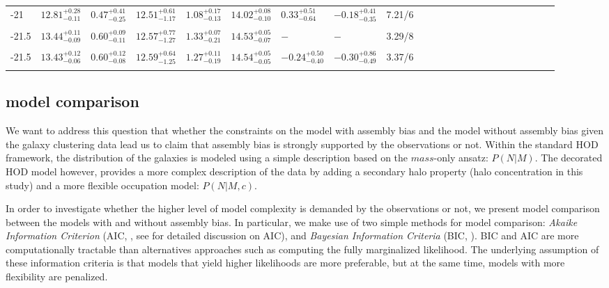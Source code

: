 \documentclass[12pt, preprint]{aastex}
\begin{document}
\begin{table}
\begin{center}
\begin{tabular}{@{}lllllllllllllllllllllll}
-21 & $12.81^{+0.28}_{-0.11}$ &  $0.47^{+0.41}_{-0.25}$ & $12.51^{+0.61}_{-1.17}$ & $1.08^{+0.17}_{-0.13}$ &  $14.02^{+0.08}_{-0.10}$ & $0.33^{+0.51}_{-0.64}$ & $-0.18^{+0.41}_{-0.35}$ & 7.21/6\\ \\

-21.5 & $13.44^{+0.11}_{-0.09}$ &  $0.60^{+0.09}_{-0.11}$ & $12.57^{+0.77}_{-1.27}$ & $1.33^{+0.07}_{-0.21}$ &  $14.53^{+0.05}_{-0.07}$ & $-$ & $-$ & 3.29/8\\ \\

-21.5 & $13.43^{+0.12}_{-0.06}$ &  $0.60^{+0.12}_{-0.08}$ & $12.59^{+0.64}_{-1.25}$ & $1.27^{+0.11}_{-0.19}$ &  $14.54^{+0.05}_{-0.05}$ & $-0.24^{+0.50}_{-0.40}$ & $-0.30^{+0.86}_{-0.49}$ & 3.37/6\\ \\
                 
 \hline
  \end{tabular}
\end{center}
\end{table}



\subsection{model comparison}

We want to address this question that whether the constraints on the model with assembly bias and the model without assembly bias given the galaxy clustering data lead us to claim that assembly bias is strongly supported by the observations or not. Within the standard HOD framework, the distribution of the galaxies is modeled using a simple description based on the $mass$-only ansatz: $P(N|M)$. The decorated HOD model however, provides a more complex description of the data by adding a secondary halo property (halo concentration in this study) and a more flexible occupation model: $P(N|M,c)$. 

In order to investigate whether the higher level of model complexity is demanded by the observations or not, we present model comparison between the models with and without assembly bias. In particular, we make use of two simple methods for model comparison: \emph{Akaike Information Criterion} (AIC, \citealt{aic} , see \citealt{gelmanic} for detailed discussion on AIC), and \emph{Bayesian Information Criteria} (BIC, \citealt{bic}). BIC and AIC are more computationally tractable than alternatives approaches such as computing the fully marginalized likelihood. The underlying assumption of these information criteria is that models that yield higher likelihoods are more preferable, but at the same time, models with more flexibility are penalized.
\end{document}
